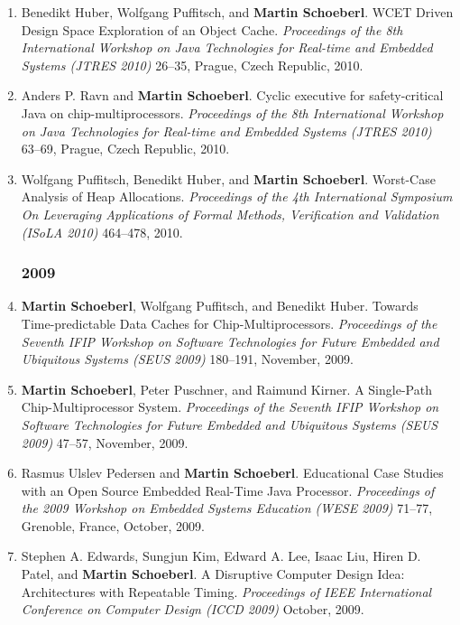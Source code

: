 \begin{enumerate}
\item Benedikt Huber, Wolfgang Puffitsch, and {\bf Martin Schoeberl}.
 WCET Driven Design Space Exploration of an Object Cache.
 \emph{Proceedings of the 8th International Workshop on Java Technologies for Real-time and Embedded Systems (JTRES 2010)} 26--35, Prague, Czech Republic, 2010.

\item Anders P. Ravn and {\bf Martin Schoeberl}.
 Cyclic executive for safety-critical Java on chip-multiprocessors.
 \emph{Proceedings of the 8th International Workshop on Java Technologies for Real-time and Embedded Systems (JTRES 2010)} 63--69, Prague, Czech Republic, 2010.

\item Wolfgang Puffitsch, Benedikt Huber, and {\bf Martin Schoeberl}.
 Worst-Case Analysis of Heap Allocations.
 \emph{Proceedings of the 4th International Symposium On Leveraging Applications of Formal Methods, Verification and Validation (ISoLA 2010)} 464--478, 2010.


\subsubsection*{2009}

\item {\bf Martin Schoeberl}, Wolfgang Puffitsch, and Benedikt Huber.
 Towards Time-predictable Data Caches for Chip-Multiprocessors.
 \emph{Proceedings of the Seventh IFIP Workshop on Software Technologies for Future Embedded and Ubiquitous Systems (SEUS 2009)} 180--191, November, 2009.

\item {\bf Martin Schoeberl}, Peter Puschner, and Raimund Kirner.
 A Single-Path Chip-Multiprocessor System.
 \emph{Proceedings of the Seventh IFIP Workshop on Software Technologies for Future Embedded and Ubiquitous Systems (SEUS 2009)} 47--57, November, 2009.

\item Rasmus Ulslev Pedersen and {\bf Martin Schoeberl}.
 Educational Case Studies with an Open Source Embedded Real-Time Java Processor.
 \emph{Proceedings of the 2009 Workshop on Embedded Systems Education (WESE 2009)} 71--77, Grenoble, France, October, 2009.

\item Stephen A. Edwards, Sungjun Kim, Edward A. Lee, Isaac Liu, Hiren D. Patel, and {\bf Martin Schoeberl}.
 A Disruptive Computer Design Idea: Architectures with Repeatable Timing.
 \emph{Proceedings of IEEE International Conference on Computer Design (ICCD 2009)} October, 2009.


\end{enumerate}
